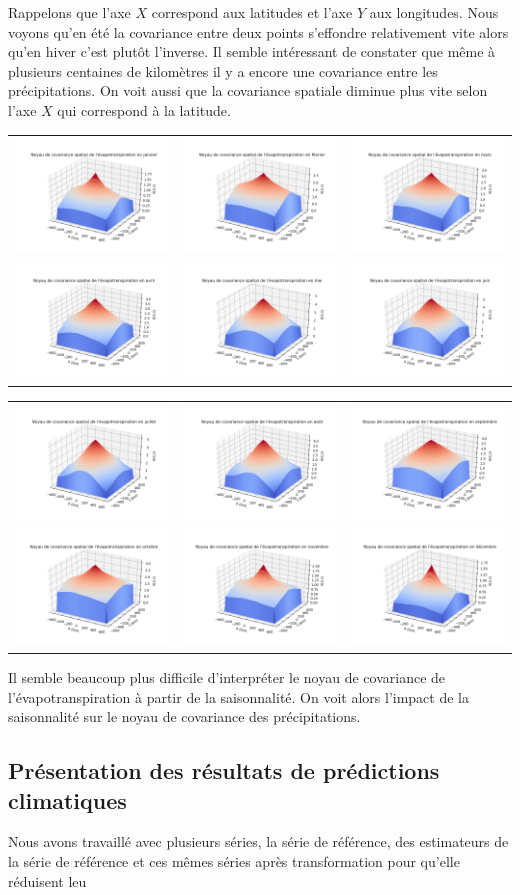 \documentclass[a4paper,11pt]{article}
\begin{document}
Rappelons que l'axe $X$ correspond aux latitudes et l'axe $Y$ aux longitudes. Nous voyons qu'en été la covariance entre deux points s'effondre relativement vite alors qu'en hiver c'est plutôt l'inverse.
Il semble intéressant de constater que même à plusieurs centaines de kilomètres il y a encore une covariance entre les précipitations. On voit aussi que la covariance spatiale diminue plus vite selon l'axe $X$ qui correspond à la latitude.

\hspace{-3cm}
\begin{tabular}{ccc} 
	\includegraphics[scale=0.4]{images/kernel_evap_m1.png} & \includegraphics[scale=0.4]{images/kernel_evap_m2.png} & \includegraphics[scale=0.4]{images/kernel_evap_m3.png} \\ 
	\includegraphics[scale=0.4]{images/kernel_evap_m4.png} & \includegraphics[scale=0.4]{images/kernel_evap_m5.png} & \includegraphics[scale=0.4]{images/kernel_evap_m6.png} \\
\end{tabular}

\hspace{-3cm}
\begin{tabular}{ccc}
	\includegraphics[scale=0.4]{images/kernel_evap_m7.png} & \includegraphics[scale=0.4]{images/kernel_evap_m8.png} & \includegraphics[scale=0.4]{images/kernel_evap_m9.png} \\ 
	\includegraphics[scale=0.4]{images/kernel_evap_m10.png} & \includegraphics[scale=0.4]{images/kernel_evap_m11.png} & \includegraphics[scale=0.4]{images/kernel_evap_m12.png} \\
\end{tabular} 

Il semble beaucoup plus difficile d'interpréter le noyau de covariance de l'évapotranspiration à partir de la saisonnalité. On voit alors l'impact de la saisonnalité sur le noyau de covariance des précipitations.

\subsection{Présentation des résultats de prédictions climatiques}

Nous avons travaillé avec plusieurs séries, la série de référence, des estimateurs de la série de référence et ces mêmes séries après transformation pour qu'elle réduisent leu
\end{document}
